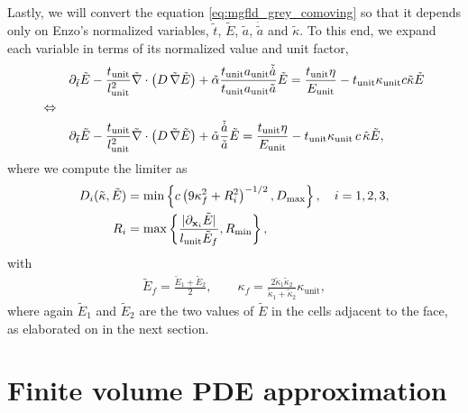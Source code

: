 \documentclass[10pt]{article}
\renewcommand{\(}{\left(}
\renewcommand{\)}{\right)}
\newcommand{\xvec}{{\bf x}}
\newcommand{\adot}{\dot{a}}
\newcommand{\Aunit}{a_{\text{unit}}}
\newcommand{\Lunit}{l_{\text{unit}}}
\newcommand{\Tunit}{t_{\text{unit}}}
\newcommand{\Eunit}{E_{\text{unit}}}
\newcommand{\Kunit}{\kappa_{\text{unit}}}
\newcommand{\tK}{\tilde{\kappa}}
\newcommand{\tT}{\tilde{t}}
\newcommand{\tE}{\tilde{E}}
\newcommand{\tA}{\tilde{a}}
\newcommand{\tAdot}{\tilde{\adot}}
\newcommand{\talpha}{\tilde{\alpha}}
\newcommand{\tnabla}{\tilde{\nabla}}
\begin{document}
Lastly, we will convert the equation \eqref{eq:mgfld_grey_comoving} so
that it depends only on Enzo's normalized variables, $\tT$, $\tE$,
$\tA$, $\dot{\tA}$ and $\tK$.  To this end, we expand each
variable in terms of its normalized value and unit factor, 
\begin{align}
  \notag
  &\partial_{\tT} \tE - \frac{\Tunit}{\Lunit^2}\tnabla\cdot\(D\,\tnabla \tE\)
    + \talpha\frac{\Tunit \Aunit\tAdot}{\Tunit \Aunit\tA} \tE = 
    \frac{\Tunit\eta}{\Eunit} - \Tunit \Kunit c \tK \tE \\
  \Leftrightarrow \quad & \\
  \label{eq:mgfld_grey_comoving_normalized}
  &\partial_{\tT} \tE - \frac{\Tunit}{\Lunit^2}\tnabla\cdot\(D\,\tnabla \tE\)
    + \talpha\frac{\tAdot}{\tA} \tE = 
    \frac{\Tunit\eta}{\Eunit} - \Tunit \Kunit\, c\, \tK \tE,
\end{align}
where we compute the limiter as
\begin{align}
  \label{eq:Morel_limiterD_normalized}
  D_i(\tK,\tE) &= \min\left\{ c \left(9\kappa_f^2 + R_i^2\right)^{-1/2},
    D_\text{max} \right\}, \quad i=1,2,3,\\
  \label{eq:Morel_limiterR_normalized}
  R_i &= \max\left\{ \frac{|\partial_{\xvec_i}\tE|}{\Lunit \tE_f}, R_\text{min} \right\},
\end{align}
with
\begin{align}
  \label{eq:face_values_normalized}
  \tE_f = \frac{\tE_1 + \tE_2}{2}, \qquad 
  \kappa_f = \frac{2\tK_1\tK_2}{\tK_1+\tK_2}\Kunit,
\end{align}
where again $\tE_1$ and $\tE_2$ are the two values of $\tE$ in the
cells adjacent to the face, as elaborated on in the next section. 






\section{Finite volume PDE approximation}
\label{sec:fv_approximation}
\end{document}
